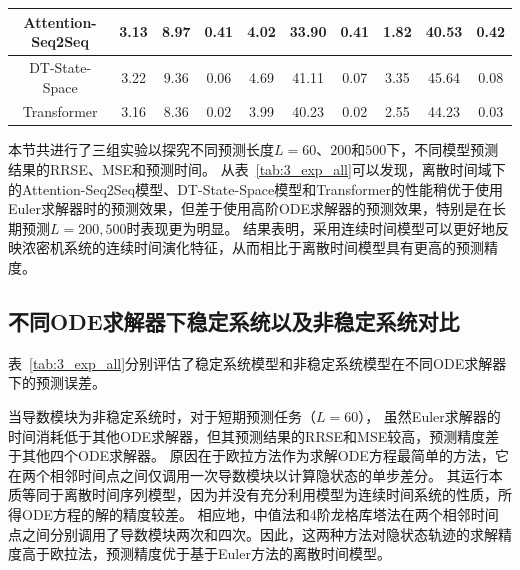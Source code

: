 \begin{table}[htpb]
{\begin{tabular}{c|c|ccccccccc}
\multicolumn{2}{c|}{Attention-Seq2Seq\cite{Member2019}}                                                                             & 3.13                 & 8.97                 & \multicolumn{1}{c|}{0.41}             & 4.02                 & 33.90                & \multicolumn{1}{c|}{0.41}              & 1.82                 & 40.53                & 0.42                 \\ \hline
\multicolumn{2}{c|}{DT-State-Space\cite{Rangapuram2018}}                                                                               & 3.22                 & 9.36                 & \multicolumn{1}{c|}{0.06}             & 4.69                 & 41.11                & \multicolumn{1}{c|}{0.07}              & 3.35                 & 45.64                & 0.08                 \\
\multicolumn{2}{c|}{Transformer\cite{Wu2020}}                                                                               & 3.16                 & 8.36                 & \multicolumn{1}{c|}{0.02}             & 3.99                 & 40.23                & \multicolumn{1}{c|}{0.02}              & 2.55                 & 44.23                & 0.03                 \\
\bottomrule
\end{tabular}}
\end{table}

本节共进行了三组实验以探究不同预测长度$L=60$、$200$和$500$下，不同模型预测结果的RRSE、MSE和预测时间。
从表~\ref{tab:3_exp_all}可以发现，离散时间域下的Attention-Seq2Seq模型、DT-State-Space模型和Transformer的性能稍优于使用Euler求解器时的预测效果，但差于使用高阶ODE求解器的预测效果，特别是在长期预测$L=200, 500$时表现更为明显。
结果表明，采用连续时间模型可以更好地反映浓密机系统的连续时间演化特征，从而相比于离散时间模型具有更高的预测精度。

\subsection{不同ODE求解器下稳定系统以及非稳定系统对比}
表~\ref{tab:3_exp_all}分别评估了稳定系统模型和非稳定系统模型在不同ODE求解器下的预测误差。

当导数模块为非稳定系统时，对于短期预测任务（$L = 60$），
虽然Euler求解器的时间消耗低于其他ODE求解器，但其预测结果的RRSE和MSE较高，预测精度差于其他四个ODE求解器。
原因在于欧拉方法作为求解ODE方程最简单的方法，它在两个相邻时间点之间仅调用一次导数模块以计算隐状态的单步差分。
其运行本质等同于离散时间序列模型，因为并没有充分利用模型为连续时间系统的性质，所得ODE方程的解的精度较差。
相应地，中值法和4阶龙格库塔法在两个相邻时间点之间分别调用了导数模块两次和四次。因此，这两种方法对隐状态轨迹的求解精度高于欧拉法，预测精度优于基于Euler方法的离散时间模型。



